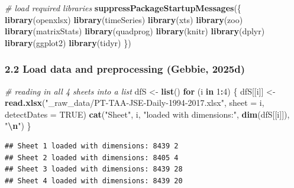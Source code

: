 \documentclass[
  12pt,
]{article}
\newenvironment{Shaded}{\begin{snugshade}}{\end{snugshade}}
\newcommand{\AttributeTok}[1]{\textcolor[rgb]{0.13,0.29,0.53}{#1}}
\newcommand{\CommentTok}[1]{\textcolor[rgb]{0.56,0.35,0.01}{\textit{#1}}}
\newcommand{\ConstantTok}[1]{\textcolor[rgb]{0.56,0.35,0.01}{#1}}
\newcommand{\ControlFlowTok}[1]{\textcolor[rgb]{0.13,0.29,0.53}{\textbf{#1}}}
\newcommand{\DecValTok}[1]{\textcolor[rgb]{0.00,0.00,0.81}{#1}}
\newcommand{\FunctionTok}[1]{\textcolor[rgb]{0.13,0.29,0.53}{\textbf{#1}}}
\newcommand{\NormalTok}[1]{#1}
\newcommand{\OtherTok}[1]{\textcolor[rgb]{0.56,0.35,0.01}{#1}}
\newcommand{\SpecialCharTok}[1]{\textcolor[rgb]{0.81,0.36,0.00}{\textbf{#1}}}
\newcommand{\StringTok}[1]{\textcolor[rgb]{0.31,0.60,0.02}{#1}}
\begin{document}
\begin{Shaded}
\begin{Highlighting}[]
\CommentTok{\# load required libraries}
\FunctionTok{suppressPackageStartupMessages}\NormalTok{(\{}
\FunctionTok{library}\NormalTok{(openxlsx)     }
\FunctionTok{library}\NormalTok{(timeSeries)   }
\FunctionTok{library}\NormalTok{(xts)          }
\FunctionTok{library}\NormalTok{(zoo)          }
\FunctionTok{library}\NormalTok{(matrixStats) }
\FunctionTok{library}\NormalTok{(quadprog)     }
\FunctionTok{library}\NormalTok{(knitr)        }
\FunctionTok{library}\NormalTok{(dplyr)        }
\FunctionTok{library}\NormalTok{(ggplot2)      }
\FunctionTok{library}\NormalTok{(tidyr)  }
\NormalTok{\})}
\end{Highlighting}
\end{Shaded}

\subsubsection{2.2 Load data and preprocessing (Gebbie,
2025d)}\label{load-data-and-preprocessing-tim_prep-1}

\begin{Shaded}
\begin{Highlighting}[]
\CommentTok{\# reading in all 4 sheets into a list}
\NormalTok{dfS }\OtherTok{\textless{}{-}} \FunctionTok{list}\NormalTok{()}
\ControlFlowTok{for}\NormalTok{ (i }\ControlFlowTok{in} \DecValTok{1}\SpecialCharTok{:}\DecValTok{4}\NormalTok{) \{}
\NormalTok{  dfS[[i]] }\OtherTok{\textless{}{-}} \FunctionTok{read.xlsx}\NormalTok{(}\StringTok{"\_raw\_data/PT{-}TAA{-}JSE{-}Daily{-}1994{-}2017.xlsx"}\NormalTok{, }\AttributeTok{sheet =}\NormalTok{ i, }\AttributeTok{detectDates =} \ConstantTok{TRUE}\NormalTok{)}
  \FunctionTok{cat}\NormalTok{(}\StringTok{"Sheet"}\NormalTok{, i, }\StringTok{"loaded with dimensions:"}\NormalTok{, }\FunctionTok{dim}\NormalTok{(dfS[[i]]), }\StringTok{"}\SpecialCharTok{\textbackslash{}n}\StringTok{"}\NormalTok{)}
\NormalTok{\}}
\end{Highlighting}
\end{Shaded}

\begin{verbatim}
## Sheet 1 loaded with dimensions: 8439 2 
## Sheet 2 loaded with dimensions: 8405 4 
## Sheet 3 loaded with dimensions: 8439 28 
## Sheet 4 loaded with dimensions: 8439 20
\end{verbatim}
\end{document}
